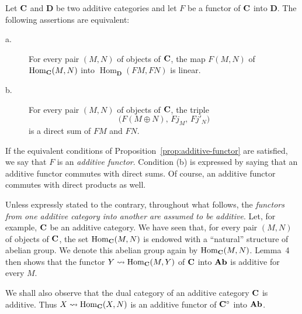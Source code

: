 \begin{proposition}\label{prop:additive-functor}
Let $\mathbf{C}$ and $\mathbf{D}$ be two additive categories and let $F$ be a
functor of $\mathbf{C}$ into $\mathbf{D}$. The following assertions are equivalent:

\begin{description}
\item[\normalfont a.] For every pair $(M,N)$ of objects of $\mathbf{C}$, the map
$F(M,N)$ of $\operatorname{Hom}_{\mathbf{C}}(M,N)$ into
$\operatorname{Hom}_{\mathbf{D}}(FM,FN)$ is linear.

\item[\normalfont b.] For every pair $(M,N)$ of objects of $\mathbf{C}$, the triple
\[
  \bigl(F(M \oplus N),\, Fj_M,\, Fj'_N\bigr)
\]
is a direct sum of $FM$ and $FN$.
\end{description}
\end{proposition}

If the equivalent conditions of Proposition~\ref{prop:additive-functor} are
satisfied, we say that $F$ is an \emph{additive functor}. Condition (b) is
expressed by saying that an additive functor commutes with direct sums. Of
course, an additive functor commutes with direct products as well.

Unless expressly stated to the contrary, throughout what follows, the
\emph{functors from one additive category into another are assumed to be
additive}. Let, for example, $\mathbf{C}$ be an additive category. We have seen
that, for every pair $(M,N)$ of objects of $\mathbf{C}$, the set
$\operatorname{Hom}_{\mathbf{C}}(M,N)$ is endowed with a ``natural'' structure of
abelian group. We denote this abelian group again by
$\operatorname{Hom}_{\mathbf{C}}(M,N)$. Lemma~4 then shows that the functor
$Y\leadsto \operatorname{Hom}_{\mathbf{C}}(M,Y)$ of $\mathbf{C}$ into $\mathbf{Ab}$ is additive
for every $M$.

We shall also observe that the dual category of an additive category $\mathbf{C}$
is additive. Thus $X\leadsto \operatorname{Hom}_{\mathbf{C}}(X,N)$ is an additive
functor of $\mathbf{C}^{\circ}$ into $\mathbf{Ab}$.
